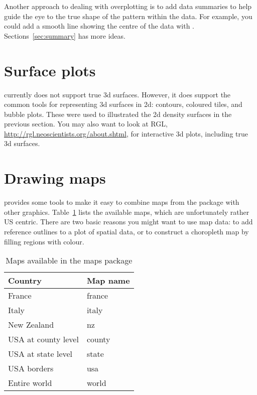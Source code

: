 Another approach to dealing with overplotting is to add data summaries to help guide the eye to the true shape of the pattern within the data.  For example,  you could add a smooth line showing the centre of the data with . Sections~\ref{sec:summary} has more ideas.


\section{Surface plots}
\label{sec:surface}

\ggplot currently does not support true 3d surfaces.  However, it does support the common tools for representing 3d surfaces in 2d: contours, coloured tiles, and bubble plots.  These were used to illustrated the 2d density surfaces in the previous section.  You may also want to look at RGL, \url{http://rgl.neoscientists.org/about.shtml}, for interactive 3d plots, including true 3d surfaces.

\section{Drawing maps}
\label{sec:maps}

\ggplot provides some tools to make it easy to combine maps from the  package with other \ggplot graphics.  Table~\ref{tbl:maps} lists the available maps, which are unfortunately rather US centric.  There are two basic reasons you might want to use map data: to add reference outlines to a plot of spatial data, or to construct a choropleth map by filling regions with colour.

\begin{table}
  \begin{center}
  \begin{tabular}{ll}
    \toprule
    Country & Map name \\
    \midrule
    France & france \\
    Italy & italy \\
    New Zealand & nz \\
    USA at county level & county \\
    USA at state level & state \\
    USA borders & usa \\
    Entire world & world \\ 
    \bottomrule
  \end{tabular}
  \end{center}
  \caption{Maps available in the maps package}
  \label{tbl:maps}
\end{table}

